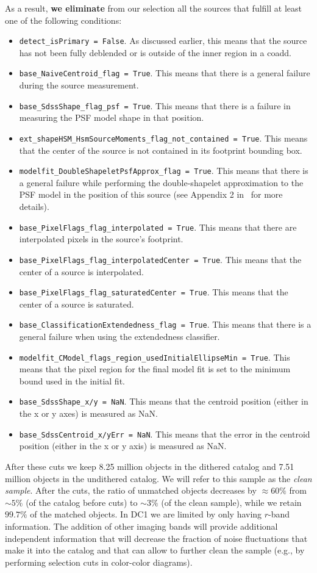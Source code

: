 \documentclass[\docopts]{\docclass}
\begin{document}
As a result, \textbf{we eliminate} from our selection all the sources that fulfill at least one of the following conditions:
\begin{itemize}
\item \texttt{detect\_isPrimary = False}. As discussed earlier, this means that the source has not been fully deblended or is outside of the inner region in a coadd.
\item \texttt{base\_NaiveCentroid\_flag = True}. This means that there is a general failure during the source measurement.
\item \texttt{base\_SdssShape\_flag\_psf = True}. This means that there is a failure in measuring the PSF model shape in that position.
\item \texttt{ext\_shapeHSM\_HsmSourceMoments\_flag\_not\_contained = True}. This means that the center of the source is not contained in its footprint bounding box.
\item \texttt{modelfit\_DoubleShapeletPsfApprox\_flag = True}. This means that there is a general failure while performing the double-shapelet approximation to the PSF model in the position of this source (see Appendix 2 in~\citet{2018PASJ...70S...5B} for more details).
\item \texttt{base\_PixelFlags\_flag\_interpolated = True}. This means that there are interpolated pixels in the source's footprint.
\item \texttt{base\_PixelFlags\_flag\_interpolatedCenter = True}. This means that the center of a source is interpolated.
\item \texttt{base\_PixelFlags\_flag\_saturatedCenter = True}. This means that the center of a source is saturated.
\item \texttt{base\_ClassificationExtendedness\_flag = True}. This means that there is a general failure when using the extendedness classifier.
\item \texttt{modelfit\_CModel\_flags\_region\_usedInitialEllipseMin = True}. This means that the pixel region for the final model fit is set to the minimum bound used in the initial fit.
\item \texttt{base\_SdssShape\_x/y = NaN}. This means that the centroid position (either in the x or y axes) is measured as NaN.
\item \texttt{base\_SdssCentroid\_x/yErr = NaN}. This means that the error in the centroid position (either in the x or y axis) is measured as NaN.
\end{itemize}

After these cuts we keep 8.25 million objects in the dithered catalog and 7.51 million objects in the undithered catalog. We will refer to this sample as the \textit{clean sample}. After the cuts, the ratio of unmatched objects decreases by $\approx 60\%$ from $\sim 5\%$ (of the catalog before cuts) to $\sim 3\%$ (of the clean sample), while we retain $99.7\%$ of the matched objects. In DC1 we are limited by only having $r$-band information. The addition of other imaging bands will provide additional independent information that will decrease the fraction of noise fluctuations that make it into the catalog and that can allow to further clean the sample (e.g., by performing selection cuts in color-color diagrams).
\end{document}

